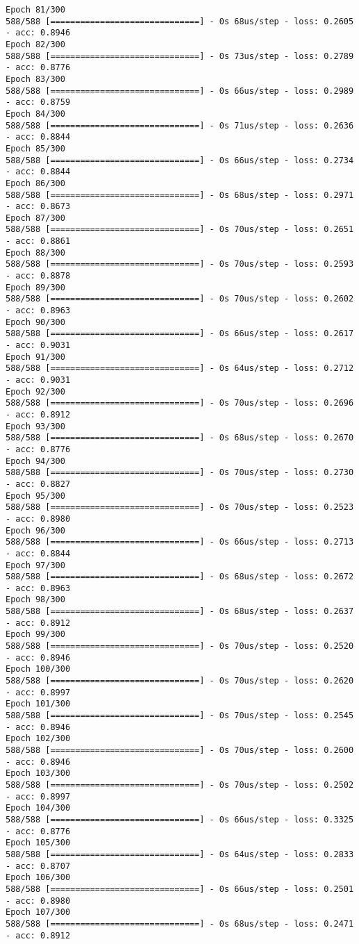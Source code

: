 \documentclass[11pt]{article}
\begin{document}
\begin{Verbatim}[commandchars=\\\{\}]
Epoch 81/300
588/588 [==============================] - 0s 68us/step - loss: 0.2605 - acc: 0.8946
Epoch 82/300
588/588 [==============================] - 0s 73us/step - loss: 0.2789 - acc: 0.8776
Epoch 83/300
588/588 [==============================] - 0s 66us/step - loss: 0.2989 - acc: 0.8759
Epoch 84/300
588/588 [==============================] - 0s 71us/step - loss: 0.2636 - acc: 0.8844
Epoch 85/300
588/588 [==============================] - 0s 66us/step - loss: 0.2734 - acc: 0.8844
Epoch 86/300
588/588 [==============================] - 0s 68us/step - loss: 0.2971 - acc: 0.8673
Epoch 87/300
588/588 [==============================] - 0s 70us/step - loss: 0.2651 - acc: 0.8861
Epoch 88/300
588/588 [==============================] - 0s 70us/step - loss: 0.2593 - acc: 0.8878
Epoch 89/300
588/588 [==============================] - 0s 70us/step - loss: 0.2602 - acc: 0.8963
Epoch 90/300
588/588 [==============================] - 0s 66us/step - loss: 0.2617 - acc: 0.9031
Epoch 91/300
588/588 [==============================] - 0s 64us/step - loss: 0.2712 - acc: 0.9031
Epoch 92/300
588/588 [==============================] - 0s 70us/step - loss: 0.2696 - acc: 0.8912
Epoch 93/300
588/588 [==============================] - 0s 68us/step - loss: 0.2670 - acc: 0.8776
Epoch 94/300
588/588 [==============================] - 0s 70us/step - loss: 0.2730 - acc: 0.8827
Epoch 95/300
588/588 [==============================] - 0s 70us/step - loss: 0.2523 - acc: 0.8980
Epoch 96/300
588/588 [==============================] - 0s 66us/step - loss: 0.2713 - acc: 0.8844
Epoch 97/300
588/588 [==============================] - 0s 68us/step - loss: 0.2672 - acc: 0.8963
Epoch 98/300
588/588 [==============================] - 0s 68us/step - loss: 0.2637 - acc: 0.8912
Epoch 99/300
588/588 [==============================] - 0s 70us/step - loss: 0.2520 - acc: 0.8946
Epoch 100/300
588/588 [==============================] - 0s 70us/step - loss: 0.2620 - acc: 0.8997
Epoch 101/300
588/588 [==============================] - 0s 70us/step - loss: 0.2545 - acc: 0.8946
Epoch 102/300
588/588 [==============================] - 0s 70us/step - loss: 0.2600 - acc: 0.8946
Epoch 103/300
588/588 [==============================] - 0s 70us/step - loss: 0.2502 - acc: 0.8997
Epoch 104/300
588/588 [==============================] - 0s 66us/step - loss: 0.3325 - acc: 0.8776
Epoch 105/300
588/588 [==============================] - 0s 64us/step - loss: 0.2833 - acc: 0.8707
Epoch 106/300
588/588 [==============================] - 0s 66us/step - loss: 0.2501 - acc: 0.8980
Epoch 107/300
588/588 [==============================] - 0s 68us/step - loss: 0.2471 - acc: 0.8912

\end{Verbatim}
\end{document}
